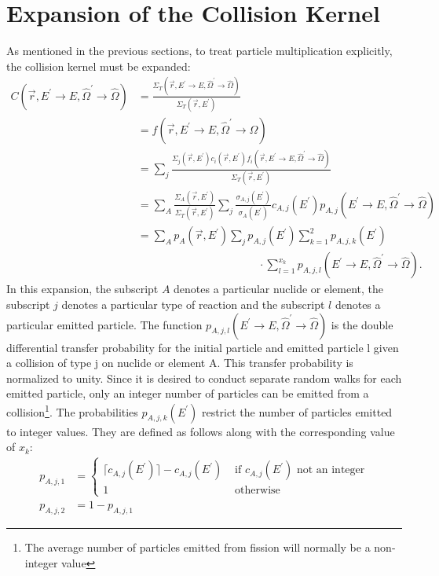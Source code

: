 \section{Expansion of the Collision Kernel}
As mentioned in the previous sections, to treat particle multiplication
explicitly, the collision kernel must be expanded:
\begin{align}
  C(\vec{r},E^{'} \to E, \hat{\Omega}^{'} \to \hat{\Omega}) & =
  \frac{\Sigma_T(\vec{r},E^{'} \to E,\hat{\Omega}^{'} \to \hat{\Omega})}
       {\Sigma_T(\vec{r},E^{'})} \nonumber \\
  & = f(\vec{r},E^{'} \to E,\hat{\Omega}^{'} \to \hat{\Omega}) \nonumber \\
  & = \sum_j \frac{\Sigma_j(\vec{r},E^{'})c_i(\vec{r},E^{'})
            f_i(\vec{r},E^{'} \to E,\hat{\Omega}^{'} \to \hat{\Omega})}
           {\Sigma_T(\vec{r},E^{'})} \nonumber \\
  & = \sum_A \frac{\Sigma_A(\vec{r},E^{'})}{\Sigma_T(\vec{r},E^{'})}
      \sum_j \frac{\sigma_{A,j}(E^{'})}{\sigma_A(E^{'})} c_{A,j}(E^{'})
      p_{A,j}(E^{'} \to E,\hat{\Omega}^{'} \to \hat{\Omega}) \nonumber \\
  & = \sum_A p_A(\vec{r},E^{'}) \sum_j p_{A,j}(E^{'}) 
      \sum_{k=1}^2 p_{A,j,k}(E^{'}) \nonumber \\
  & \qquad \qquad \qquad \qquad \qquad \quad
      \cdot \sum_{l=1}^{x_k} 
      p_{A,j,l}(E^{'} \to E,\hat{\Omega}^{'} \to \hat{\Omega}).
  \label{eq:fully_expanded_collision_kernel}
\end{align}
In this expansion, the subscript $A$ denotes a particular nuclide or element, 
the subscript $j$ denotes a particular type of reaction and the subscript $l$ 
denotes a particular emitted particle. The function 
$p_{A,j,l}(E^{'} \to E,\hat{\Omega}^{'} \to \hat{\Omega})$ is the double
differential transfer probability for the initial particle and emitted
particle l given a collision of type j on nuclide or element A. This transfer 
probability is normalized to unity. Since it is desired to conduct 
separate random walks for each emitted particle, only an integer number of 
particles can be emitted from a collision\footnote{The average number of 
particles emitted from fission will normally be a non-integer value}. The 
probabilities $p_{A,j,k}(E^{'})$ restrict the number of particles emitted to 
integer values. They are defined as follows along with the corresponding value 
of $x_k$:
\begin{align}
  p_{A,j,1} & =
  \begin{cases}
    \lceil c_{A,j}(E^{'}) \rceil - c_{A,j}(E^{'}) & \text{ if } c_{A,j}(E^{'})
    \text{ not an integer} \\
    1 & \text{ otherwise}
  \end{cases} \\
  p_{A,j,2} & = 1 - p_{A,j,1}
\end{align}
